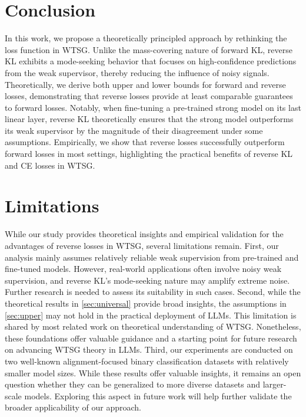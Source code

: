 \section{Conclusion}

In this work, we propose a theoretically principled approach by rethinking the loss function in WTSG.
Unlike the mass-covering nature of forward KL, reverse KL exhibits a mode-seeking behavior that focuses on high-confidence predictions from the weak supervisor, thereby reducing the influence of noisy signals.
Theoretically, we derive both upper and lower bounds for forward and reverse losses, demonstrating that reverse losses provide at least comparable guarantees to forward losses.
Notably, when fine-tuning a pre-trained strong model on its last linear layer, reverse KL theoretically ensures that the strong model outperforms its weak supervisor by the magnitude of their disagreement under some assumptions.
Empirically, we show that reverse losses successfully outperform forward losses in most settings, highlighting the practical benefits of reverse KL and CE losses in WTSG.





\newpage


\section*{Limitations}
While our study provides theoretical insights and empirical validation for the advantages of reverse losses in WTSG, several limitations remain. 
First, our analysis mainly assumes relatively reliable weak supervision from pre-trained and fine-tuned models. However, real-world applications often involve noisy weak supervision, and reverse KL’s mode-seeking nature may amplify extreme noise. Further research is needed to assess its suitability in such cases.
Second, while the theoretical results in \cref{sec:universal} provide broad insights, the assumptions in \cref{sec:upper} may not hold in the practical deployment of LLMs. 
This limitation is shared by most related work on theoretical understanding of WTSG. 
Nonetheless, these foundations offer valuable guidance and a starting point for future research on advancing WTSG theory in LLMs.
Third, our experiments are conducted on two well-known alignment-focused binary classification datasets with relatively smaller model sizes. While these results offer valuable insights, it remains an open question whether they can be generalized to more diverse datasets and larger-scale models. Exploring this aspect in future work will help further validate the broader applicability of our approach.






